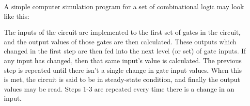 \documentclass[12pt]{article}
\begin{document}
A simple computer simulation program for a set of combinational logic may look like this:

The inputs of the circuit are implemented to the first set of gates in the circuit, and the output values of those gates are then calculated.
These outputs which changed in the first step are then fed into the next level (or set) of gate inputs. If any input has changed, then that same input's value is calculated.
The previous step is repeated until there isn't a single change in gate input values. When this is met, the circuit is said to be in steady-state condition, and finally the output values may be read.
Steps 1-3 are repeated every time there is a change in an input. 
\end{document}
